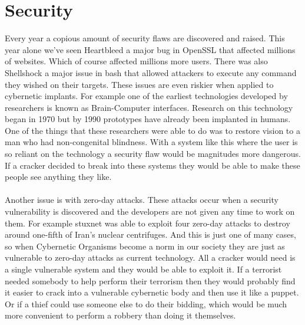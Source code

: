 \documentclass[12pt,a4paper,notitlepage]{article}
\begin{document}
\section{Security}
Every year a copious amount of security flaws are discovered and raised. This
year alone we've seen Heartbleed\cite{Heartbleed} a major bug in OpenSSL that
affected millions of websites. Which of course affected millions more users.
There was also Shellshock\cite{Shellshock} a major issue in bash that allowed
attackers to execute any command they wished on their targets. These issues are
even riskier when applied to cybernetic implants. For example one of the
earliest technologies developed by researchers is known as Brain-Computer
interfaces. Research on this technology began in 1970 but by 1990 prototypes
have already been implanted in humans. One of the things that these researchers
were able to do was to restore vision to a man who had non-congenital
blindness\cite{sight}. With a system like this where the user is so reliant on
the technology a security flaw would be magnitudes more dangerous. If a cracker
decided to break into these systems they would be able to make these people see
anything they like.
\\\\
Another issue is with zero-day attacks. These attacks occur when a security
vulnerability is discovered and the developers are not given any time to work on
them. For example stuxnet\cite{0day} was able to exploit four zero-day attacks
to destroy around one-fifth of Iran's nuclear centrifuges. And this is just one
of many cases, so when Cybernetic Organisms become a norm in our society they
are just as vulnerable to zero-day attacks as current technology. All a cracker
would need is a single vulnerable system and they would be able to exploit it.
If a terrorist needed somebody to help perform their terrorism then they would
probably find it easier to crack into a vulnerable cybernetic body and then use
it like a puppet. Or if a thief could use someone else to do their bidding,
which would be much more convenient to perform a robbery than doing it
themselves.
\end{document}
